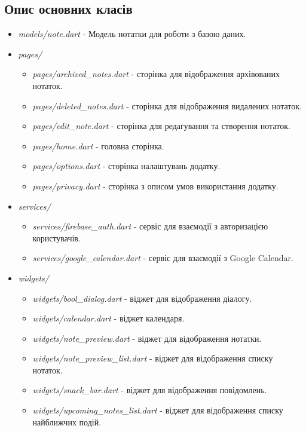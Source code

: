 \documentclass[oneside,14pt]{extarticle}
\begin{document}
\begin{normalsize}
	\section*{Опис основних класів}
	
	\begin{itemize}
		\item \textit{models/note.dart} - Модель нотатки для роботи з базою даних.
		\item \textit{pages/} \begin{itemize}
			\item \textit{pages/archived\_notes.dart} - сторінка для відображення архівованих нотаток.
			\item \textit{pages/deleted\_notes.dart} - сторінка для відображення видалених нотаток.
			\item \textit{pages/edit\_note.dart} - сторінка для редагування та створення нотаток.
			\item \textit{pages/home.dart} - головна сторінка.
			\item \textit{pages/options.dart} - сторінка налаштувань додатку.
			\item \textit{pages/privacy.dart} - сторінка з описом умов використання додатку.
		\end{itemize}
		\item \textit{services/} \begin{itemize}
			\item \textit{services/firebase\_auth.dart} - сервіс для взаємодії з авторизацією користувачів.
			\item \textit{services/google\_calendar.dart} - сервіс для взаємодії з Google Calendar.
		\end{itemize}
		\item \textit{widgets/} \begin{itemize}
			\item \textit{widgets/bool\_dialog.dart} - віджет для відображення діалогу.
			\item \textit{widgets/calendar.dart} - віджет календаря.
			\item \textit{widgets/note\_preview.dart} - віджет для відображення нотатки.
			\item \textit{widgets/note\_preview\_list.dart} - віджет для відображення списку нотаток.
			\item \textit{widgets/snack\_bar.dart} - віджет для відображення повідомлень.
			\item \textit{widgets/upcoming\_notes\_list.dart} - віджет для відображення списку найближчих подій.
		\end{itemize}
	\end{itemize}
	

\end{normalsize}
\end{document}
